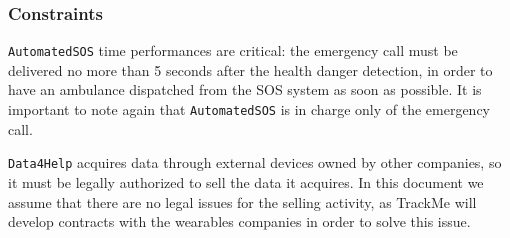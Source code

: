     \subsubsection{Constraints}

      \texttt{AutomatedSOS} time performances are critical: the emergency call must be delivered no more than 5 seconds after the health danger detection, in order to have an ambulance dispatched from the SOS system as soon as possible. It is important to note again that \texttt{AutomatedSOS} is in charge only of the emergency call.

      \texttt{Data4Help} acquires data through external devices owned by other companies, so it must be legally authorized to sell the data it acquires. In this document we assume that there are no legal issues for the selling activity, as TrackMe will develop contracts with the wearables companies in order to solve this issue.
